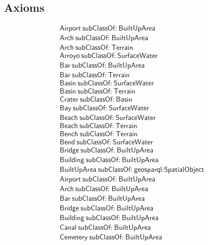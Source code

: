 \subsection{Axioms}
\begin{align}
  \textsf{Airport}~\textsf{subClassOf:}~\textsf{BuiltUpArea}\\
  \textsf{Arch}~\textsf{subClassOf:}~\textsf{BuiltUpArea}\\
  \textsf{Arch}~\textsf{subClassOf:}~\textsf{Terrain}\\
  \textsf{Arroyo}~\textsf{subClassOf:}~\textsf{SurfaceWater}\\
  \textsf{Bar}~\textsf{subClassOf:}~\textsf{BuiltUpArea}\\
  \textsf{Bar}~\textsf{subClassOf:}~\textsf{Terrain}\\
  \textsf{Basin}~\textsf{subClassOf:}~\textsf{SurfaceWater}\\
  \textsf{Basin}~\textsf{subClassOf:}~\textsf{Terrain}\\
  \textsf{Crater}~\textsf{subClassOf:}~\textsf{Basin}\\
  \textsf{Bay}~\textsf{subClassOf:}~\textsf{SurfaceWater}\\
  \textsf{Beach}~\textsf{subClassOf:}~\textsf{SurfaceWater}\\
  \textsf{Beach}~\textsf{subClassOf:}~\textsf{Terrain}\\
  \textsf{Bench}~\textsf{subClassOf:}~\textsf{Terrain}\\
  \textsf{Bend}~\textsf{subClassOf:}~\textsf{SurfaceWater}\\
  \textsf{Bridge}~\textsf{subClassOf:}~\textsf{BuiltUpArea}\\
  \textsf{Building}~\textsf{subClassOf:}~\textsf{BuiltUpArea}\\
  \textsf{BuiltUpArea}~\textsf{subClassOf:}~\textsf{geosparql:SpatialObject}\\
  \textsf{Airport}~\textsf{subClassOf:}~\textsf{BuiltUpArea}\\
  \textsf{Arch}~\textsf{subClassOf:}~\textsf{BuiltUpArea}\\
  \textsf{Bar}~\textsf{subClassOf:}~\textsf{BuiltUpArea}\\
  \textsf{Bridge}~\textsf{subClassOf:}~\textsf{BuiltUpArea}\\
  \textsf{Building}~\textsf{subClassOf:}~\textsf{BuiltUpArea}\\
  \textsf{Canal}~\textsf{subClassOf:}~\textsf{BuiltUpArea}\\
  \textsf{Cemetery}~\textsf{subClassOf:}~\textsf{BuiltUpArea}\\

\end{align}
